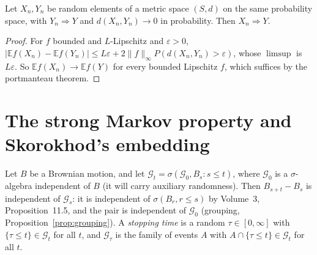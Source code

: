 \begin{lemma}\label{lem:together}
Let $X_n,Y_n$ be random elements of a metric space $(S,d)$ on the same probability space, with $Y_n\Rightarrow Y$ and $d(X_n,Y_n)\to0$ in probability. Then
$X_n\Rightarrow Y$.
\end{lemma}
\begin{proof}
For $f$ bounded and $L$-Lipschitz and $\varepsilon>0$, $|\mathbb E f(X_n)-\mathbb E f(Y_n)|\le L\varepsilon+2\|f\|_\infty P(d(X_n,Y_n)>\varepsilon)$, whose $\limsup$ is
$L\varepsilon$. So $\mathbb E f(X_n)\to\mathbb E f(Y)$ for every bounded Lipschitz $f$, which suffices by the portmanteau theorem.
\end{proof}

\section{The strong Markov property and Skorokhod's embedding}

Let $B$ be a Brownian motion, and let $\mathcal G_t=\sigma(\mathcal G_0,B_s:s\le t)$, where $\mathcal G_0$ is a $\sigma$-algebra independent of $B$ (it will carry
auxiliary randomness). Then $B_{s+t}-B_s$ is independent of $\mathcal G_s$: it is independent of $\sigma(B_r,r\le s)$ by Volume~3, Proposition~11.5, and the pair is
independent of $\mathcal G_0$ (grouping, Proposition~\ref{prop:grouping}). A \emph{stopping time} is a random $\tau\in[0,\infty]$ with $\{\tau\le t\}\in\mathcal G_t$ for
all $t$, and $\mathcal G_\tau$ is the family of events $A$ with $A\cap\{\tau\le t\}\in\mathcal G_t$ for all $t$.

